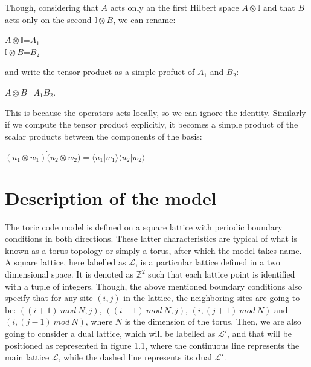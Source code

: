 \documentclass{Configuration_Files/PoliMi3i_thesis}
\begin{document}
Though, considering that $A$ acts only an the first Hilbert space $A \otimes \mathbb{I}$ and that $B$ acts only on the second $\mathbb{I} \otimes B$, we can rename:

\begin{center}
	$A \otimes \mathbb{I}$=$A_1$ \\
	$\mathbb{I} \otimes B$=$B_2$
\end{center}

and write the tensor product as a simple profuct of $A_1$ and $B_2$:

\begin{center}
	$A \otimes B$=$A_1$$B_2$.
\end{center}

This is because the operators acts locally, so we can ignore the identity. \newline
Similarly if we compute the tensor product explicitly, it becomes a simple product of the scalar products between the components of the basis:

\begin{center}
	$(u_1 \otimes w_1) \dot (u_2 \otimes w_2) = \langle u_1 | w_1 \rangle \langle u_2 | w_2 \rangle$
\end{center}








\newpage
\section{Description of the model}
\label{sec:Model}

The toric code model is defined on a square lattice with periodic boundary conditions in both directions. These latter characteristics are typical of what is known as a torus topology or simply a torus, after which the model takes name.\newline
A square lattice, here labelled as $\mathcal{L}$, is a particular lattice defined in a two dimensional space. It is denoted as $\mathbb{Z}^{2}$ such that each lattice point is identified with a tuple of integers. Though, the above mentioned boundary conditions also specify that for any site $(i, j)$ in the lattice, the neighboring sites are going to be: $((i+1) \ mod \ N, j)$, $((i-1) \ mod \ N, j)$, $(i, (j+1) \ mod \ N)$ and $(i, (j-1) \ mod \ N)$, where $N$ is the dimension of the torus.  \newline
Then, we are also going to consider a dual lattice, which will be labelled as $\mathcal{L}'$, and that will be positioned as represented in figure 1.1, where the continuous line represents the main lattice $\mathcal{L}$, while the dashed line represents its dual $\mathcal{L'}$.  	\newline
\end{document}

